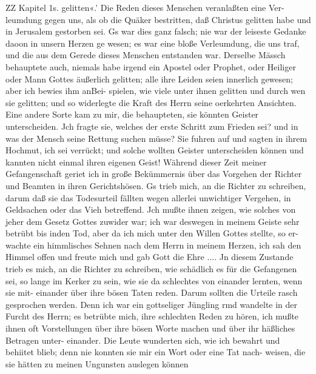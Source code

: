 ZZ Kapitel 1s.
gelitten«.' Die Reden dieses Menschen veranlaßten eine Ver-
leumdung gegen uns, als ob die Quäker bestritten, daß Christus
gelitten habe und in Jerusalem gestorben sei. Gs war dies ganz
falsch; nie war der leiseste Gedanke daoon in unsern Herzen ge
wesen; es war eine bloße Verleumdung, die uns traf, und die
aus dem Gerede dieses Menschen entstanden war. Derselbe
Mässch behauptete auch, niemals habe irgend ein Apostel oder
Prophet, oder Heiliger oder Mann Gottes äußerlich gelitten; alle
ihre Leiden seien innerlich gewesen; aber ich bewies ihm anBei-
spielen, wie viele unter ihnen gelitten und durch wen sie gelitten;
und so widerlegte die Kraft des Herrn seine oerkehrten Ansichten.
Eine andere Sorte kam zu mir, die behaupteten, sie könnten
Geister unterscheiden. Jch fragte sie, welches der erste Schritt
zum Frieden sei? und in was der Mensch seine Rettung suchen
müsse? Sie fuhren auf und sagten in ihrem Hochmut, ich sei
verrückt; und solche wollten Geister unterscheiden können und
kannten nicht einmal ihren eigenen Geist!
Während dieser Zeit meiner Gefangenschaft geriet ich in
große Bekümmernis über das Vorgehen der Richter und Beamten
in ihren Gerichtshösen. Gs trieb mich, an die Richter zu schreiben,
darum daß sie das Todesurteil fällten wegen allerlei unwichtiger
Vergehen, in Geldsachen oder das Vieh betreffend. Jch mußte
ihnen zeigen, wie solches von jeher dem Gesetz Gottes zuwider
war; ich war deswegen in meinem Geiste sehr betrübt bis inden
Tod, aber da ich mich unter den Willen Gottes stellte, so er-
wachte ein himmlisches Sehnen nach dem Herrn in meinem Herzen,
ich sah den Himmel offen und freute mich und gab Gott die
Ehre ....
Jn diesem Zustande trieb es mich, an die Richter zu schreiben,
wie schädlich es für die Gefangenen sei, so lange im Kerker zu
sein, wie sie da schlechtes von einander lernten, wenn sie mit-
einander über ihre bösen Taten reden. Darum sollten die Urteile
rasch gesprochen werden. Denn ich war ein gottseliger Jüngling
rmd wandelte in der Furcht des Herrn; es betrübte mich, ihre
schlechten Reden zu hören, ich mußte ihnen oft Vorstellungen über
ihre bösen Worte machen und über ihr häßliches Betragen unter-
einander. Die Leute wunderten sich, wie ich bewahrt und behiitet
blieb; denn nie konnten sie mir ein Wort oder eine Tat nach-
weisen, die sie hätten zu meinen Ungunsten auslegen können


